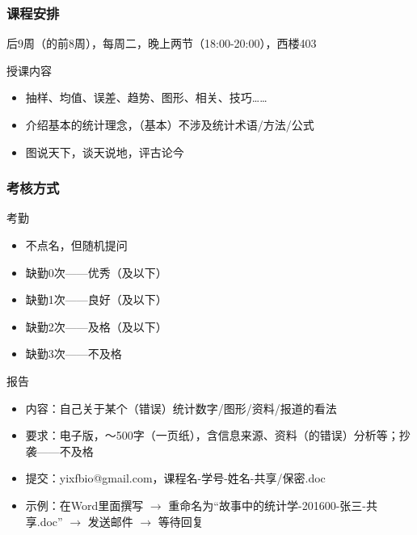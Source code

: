 \begin{frame}
  \frametitle{课程安排}
  \begin{center}
  \alert{后9周（的前8周），每周二，晚上两节（18:00-20:00），西楼403}\\
  \vspace{0.2cm}
  \end{center}
  \begin{block}{授课内容}
    \begin{itemize}
      \item 抽样、均值、误差、趋势、图形、相关、技巧……
      \item 介绍基本的统计理念，（基本）不涉及统计术语/方法/公式
      \item 图说天下，谈天说地，评古论今
    \end{itemize}
  \end{block}
\end{frame}

\begin{frame}
  \frametitle{\alert{考核方式}}
  \begin{block}{考勤}
    \begin{itemize}
      \item 不点名，但随机提问
      \item 缺勤0次——优秀（及以下）
      \item 缺勤1次——良好（及以下）
      \item 缺勤2次——及格（及以下）
      \item 缺勤3次——不及格
    \end{itemize}
  \end{block}
  \pause
  \begin{block}{报告}
    \begin{itemize}
      \item 内容：自己关于某个（错误）统计数字/图形/资料/报道的看法
      \item 要求：电子版，～500字（一页纸），含信息来源、资料（的错误）分析等；抄袭——不及格
      \item 提交：yixfbio@gmail.com，课程名-学号-姓名-共享/保密.doc
      \item 示例：在Word里面撰写 $\rightarrow$ 重命名为“故事中的统计学-201600-张三-共享.doc” $\rightarrow$ 发送邮件 $\rightarrow$ 等待回复
    \end{itemize}
  \end{block}
\end{frame}

